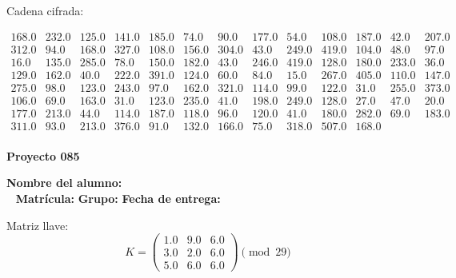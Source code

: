 \documentclass[12pt]{article}
\begin{document}
Cadena cifrada:
\begin{center}
$\begin{array}{lllllllllllll}
168.0 & 232.0 & 125.0 & 141.0 & 185.0 & 74.0 & 90.0 & 177.0 & 54.0 & 108.0 & 187.0 & 42.0 & 207.0\\
312.0 & 94.0 & 168.0 & 327.0 & 108.0 & 156.0 & 304.0 & 43.0 & 249.0 & 419.0 & 104.0 & 48.0 & 97.0\\
16.0 & 135.0 & 285.0 & 78.0 & 150.0 & 182.0 & 43.0 & 246.0 & 419.0 & 128.0 & 180.0 & 233.0 & 36.0\\
129.0 & 162.0 & 40.0 & 222.0 & 391.0 & 124.0 & 60.0 & 84.0 & 15.0 & 267.0 & 405.0 & 110.0 & 147.0\\
275.0 & 98.0 & 123.0 & 243.0 & 97.0 & 162.0 & 321.0 & 114.0 & 99.0 & 122.0 & 31.0 & 255.0 & 373.0\\
106.0 & 69.0 & 163.0 & 31.0 & 123.0 & 235.0 & 41.0 & 198.0 & 249.0 & 128.0 & 27.0 & 47.0 & 20.0\\
177.0 & 213.0 & 44.0 & 114.0 & 187.0 & 118.0 & 96.0 & 120.0 & 41.0 & 180.0 & 282.0 & 69.0 & 183.0\\
311.0 & 93.0 & 213.0 & 376.0 & 91.0 & 132.0 & 166.0 & 75.0 & 318.0 & 507.0 & 168.0\\
\end{array}$
\end{center}

\newpage


\textbf{Proyecto 085}

\textbf{Nombre del alumno:} \underline{\hspace{13cm}}\\\
\vspace{1cm}
\textbf{Matrícula:} \underline{\hspace{4cm}} \hspace{1cm}
\textbf{Grupo:} \underline{\hspace{2cm}}
\textbf{Fecha de entrega:} \underline{\hspace{2cm}}

\medskip

Matriz llave:
\[
K = \begin{pmatrix}
1.0 & 9.0 & 6.0\\
3.0 & 2.0 & 6.0\\
5.0 & 6.0 & 6.0
\end{pmatrix} \pmod{29}
\]
\end{document}
